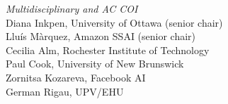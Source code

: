 \emph{Multidisciplinary and AC COI} \\
\hspace*{0.2in} Diana Inkpen, University of Ottawa (senior chair)\\
\hspace*{0.2in} Lluís Màrquez, Amazon SSAI (senior chair)\\
\hspace*{0.2in} Cecilia Alm, Rochester Institute of Technology\\
\hspace*{0.2in} Paul Cook, University of New Brunswick\\
\hspace*{0.2in} Zornitsa Kozareva, Facebook AI\\
\hspace*{0.2in} German Rigau, UPV/EHU\\
